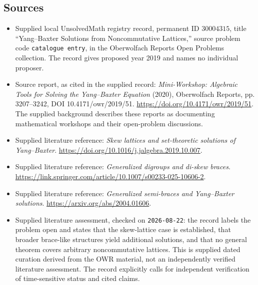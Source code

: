 \documentclass[11pt]{article}
\begin{document}
\subsection{Sources}
\begin{itemize}
\item Supplied local UnsolvedMath registry record, permanent ID \(30004315\), title ``Yang--Baxter Solutions from Noncommutative Lattices,'' source problem code \texttt{catalogue entry}, in the Oberwolfach Reports Open Problems collection. The record gives proposed year 2019 and names no individual proposer.
\item Source report, as cited in the supplied record: \emph{Mini-Workshop: Algebraic Tools for Solving the Yang--Baxter Equation} (2020), Oberwolfach Reports, pp. 3207--3242, DOI 10.4171/owr/2019/51. \url{https://doi.org/10.4171/owr/2019/51}. The supplied background describes these reports as documenting mathematical workshops and their open-problem discussions.
\item Supplied literature reference: \emph{Skew lattices and set-theoretic solutions of Yang--Baxter}. \url{https://doi.org/10.1016/j.jalgebra.2019.10.007}.
\item Supplied literature reference: \emph{Generalized digroups and di-skew braces}. \url{https://link.springer.com/article/10.1007/s00233-025-10606-2}.
\item Supplied literature reference: \emph{Generalized semi-braces and Yang--Baxter solutions}. \url{https://arxiv.org/abs/2004.01606}.
\item Supplied literature assessment, checked on \texttt{2026-08-22}: the record labels the problem open and states that the skew-lattice case is established, that broader brace-like structures yield additional solutions, and that no general theorem covers arbitrary noncommutative lattices. This is supplied dated curation derived from the OWR material, not an independently verified literature assessment. The record explicitly calls for independent verification of time-sensitive status and cited claims.
\end{itemize}
\end{document}
